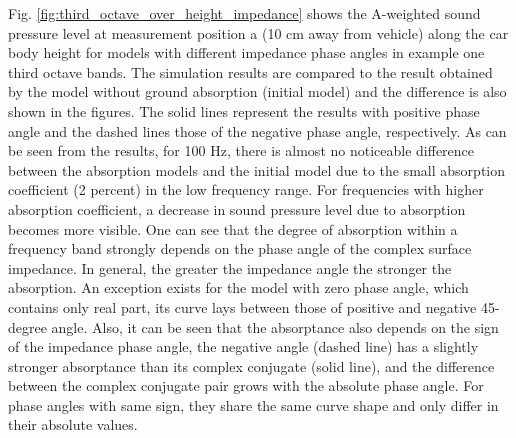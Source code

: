 Fig. \ref{fig:third_octave_over_height_impedance} shows the A-weighted sound pressure level at measurement position a (10 cm away from vehicle) along the car body height for models with different impedance phase angles in example one third octave bands. The simulation results are compared to the result obtained by the model without ground absorption (initial model) and the difference is also shown in the figures. The solid lines represent the results with positive phase angle and the dashed lines those of the negative phase angle, respectively. As can be seen from the results, for 100 Hz, there is almost no noticeable difference between the absorption models and the initial model due to the small absorption coefficient (2 percent) in the low frequency range. For frequencies with higher absorption coefficient, a decrease in sound pressure level due to absorption becomes more visible. One can see that the degree of absorption within a frequency band strongly depends on the phase angle of the complex surface impedance. In general, the greater the impedance angle the stronger the absorption. An exception exists for the model with zero phase angle, which contains only real part, its curve lays between those of positive and negative 45-degree angle. Also, it can be seen that the absorptance also depends on the sign of the impedance phase angle, the negative angle (dashed line) has a slightly stronger absorptance than its complex conjugate (solid line), and the difference between the complex conjugate pair grows with the absolute phase angle. For phase angles with same sign, they share the same curve shape and only differ in their absolute values.

